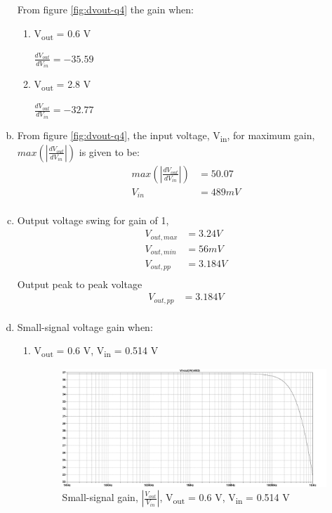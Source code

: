 \documentclass{article}
\begin{document}
\begin{enumerate}[(a)]
From figure \ref{fig:dvout-q4} the gain when:
\begin{enumerate}[1.]
\item V\textsubscript{out} = 0.6 V

\(\frac{dV_{out}}{dV_{in}} = -35.59\)
\item V\textsubscript{out} = 2.8 V

\(\frac{dV_{out}}{dV_{in}} = -32.77\)
\end{enumerate}
\item From figure \ref{fig:dvout-q4}, the input voltage, V\textsubscript{in}, for maximum gain, \(max(|\frac{dV_{out}}{dV_{in}}|)\) is given to be:
\begin{equation*}
\begin{aligned}
max(|\frac{dV_{out}}{dV_{in}}|) &= 50.07 \\
V_{in} &= 489mV \\
\end{aligned}
\end{equation*}
\item Output voltage swing for gain of 1,
\begin{equation*}
\begin{aligned}
V_{out, max} &= 3.24 V \\
V_{out, min} &= 56 mV \\
V_{out, pp} &= 3.184 V \\
\end{aligned}
\end{equation*}
Output peak to peak voltage
\begin{equation*}
\begin{aligned}
V_{out, pp} &= 3.184 V \\
\end{aligned}
\end{equation*}
\item Small-signal voltage gain when:
\begin{enumerate}[1.]
\item V\textsubscript{out} = 0.6 V, V\textsubscript{in} = 0.514 V
\begin{figure}[H]
\centering
\includegraphics[width=.9\linewidth]{img/q4/e1.pdf}
\caption{\label{fig:gain-q4-e1}Small-signal gain, \(|\frac{V_{out}}{V_{in}}|\), V\textsubscript{out} = 0.6 V, V\textsubscript{in} = 0.514 V}
\end{figure}


\end{enumerate}
\end{enumerate}
\end{document}
